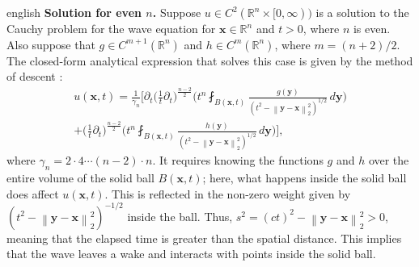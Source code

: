 \documentclass[11pt,letterpaper,twoside,openright]{book} %
\newcommand{\norm}[1]{\left\lVert #1 \right\rVert}
\begin{document}
\begin{hyphenrules}{english}
\textbf{Solution for even $n$.}
Suppose $u\in C^2(\mathbb{R}^n\times[0,\infty))$ is a solution to the Cauchy problem for the wave equation for
$\mathbf{x}\in\mathbb{R}^n$ and $t>0$, where $n$ is even. Also suppose that $g\in C^{m+1}(\mathbb{R}^n)$ and $h\in C^m(\mathbb{R}^n)$,
where $m=(n+2)/2$. The closed-form analytical expression that solves this case is given by the method
of descent \cite{evans2010}:
\begin{multline}
  u(\mathbf{x},t)=\frac{1}{\gamma_n}\Bigg[\partial_t\Big(\frac1t\partial_t\Big)^{\frac{n-2}{2}}
    \Big(t^{n}\fint_{B(\mathbf{x},t)}\frac{g(\mathbf{y})}{(t^2-\norm{\mathbf{y}-\mathbf{x}}_2^2)^{1/2}}\,d\mathbf{y}\Big)\\
    +\Big(\frac1t\partial_t\Big)^{\frac{n-2}{2}}
    \Big(t^{n}\fint_{B(\mathbf{x},t)}\frac{h(\mathbf{y})}{(t^2-\norm{\mathbf{y}-\mathbf{x}}_2^2)^{1/2}}\,d\mathbf{y}\Big)\Bigg],
  \label{eq:wave-even}
\end{multline}
where $\gamma_n=2\cdot4\cdots(n-2)\cdot n$. It requires knowing the functions $g$ and $h$ over the
entire volume of the solid ball $B(\mathbf{x},t)$; here, what happens inside the solid ball does affect
$u(\mathbf{x},t)$. This is reflected in the non-zero weight given by $(t^2-\norm{\mathbf{y}-\mathbf{x}}_2^2)^{-1/2}$ inside the
ball. Thus, $s^2=(ct)^2-\norm{\mathbf{y}-\mathbf{x}}_2^2>0$, meaning that the elapsed time is greater than the spatial
distance. This implies that the wave leaves a wake and interacts with points inside the solid ball.


\end{hyphenrules}
\end{document}
